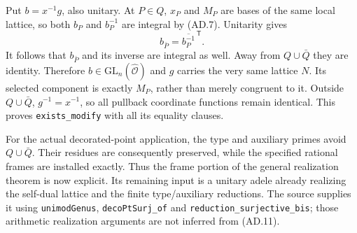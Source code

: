 Put $b=x^{-1}g$, also unitary. At $P\in Q$, $x_P$ and
$M_P$ are bases of the same local lattice, so both $b_P$
and $b_P^{-1}$ are integral by (AD.7). Unitarity gives
\[
            b_{\bar P}=\overline{b_P^{-1}}^{\,\mathsf T}.
                                                               \tag{AD.12}
\]
It follows that $b_{\bar P}$ and its inverse are integral
as well. Away from $Q\cup\bar Q$ they are identity.
Therefore $b\in\mathrm{GL}_n(\widehat{\mathcal O})$ and
$g$ carries the very same lattice $N$. Its selected component
is exactly $M_P$, rather than merely congruent to it.
Outside $Q\cup\bar Q$, $g^{-1}=x^{-1}$, so all pullback
coordinate functions remain identical. This proves
\texttt{exists\_modify} with all its equality clauses.

For the actual decorated-point application, the type and auxiliary
primes avoid $Q\cup\bar Q$. Their residues are consequently
preserved, while the specified rational frames are installed
exactly. Thus the frame portion of the general realization
theorem is now explicit. Its remaining input is a unitary
adele already realizing the self-dual lattice and the finite
type/auxiliary reductions. The source supplies it using
\texttt{unimodGenus}, \texttt{decoPtSurj\_of} and
\texttt{reduction\_surjective\_bis}; those arithmetic
realization arguments are not inferred from (AD.11).
